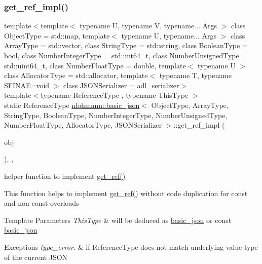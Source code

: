 \subsubsection{\texorpdfstring{get\+\_\+ref\+\_\+impl()}{get\_ref\_impl()}}
{\footnotesize\ttfamily template$<$template$<$ typename U, typename V, typename... Args $>$ class Object\+Type = std\+::map, template$<$ typename U, typename... Args $>$ class Array\+Type = std\+::vector, class String\+Type  = std\+::string, class Boolean\+Type  = bool, class Number\+Integer\+Type  = std\+::int64\+\_\+t, class Number\+Unsigned\+Type  = std\+::uint64\+\_\+t, class Number\+Float\+Type  = double, template$<$ typename U $>$ class Allocator\+Type = std\+::allocator, template$<$ typename T, typename S\+F\+I\+N\+A\+E=void $>$ class J\+S\+O\+N\+Serializer = adl\+\_\+serializer$>$ \\
template$<$typename Reference\+Type , typename This\+Type $>$ \\
static Reference\+Type \mbox{\hyperlink{classnlohmann_1_1basic__json}{nlohmann\+::basic\+\_\+json}}$<$ Object\+Type, Array\+Type, String\+Type, Boolean\+Type, Number\+Integer\+Type, Number\+Unsigned\+Type, Number\+Float\+Type, Allocator\+Type, J\+S\+O\+N\+Serializer $>$\+::get\+\_\+ref\+\_\+impl (\begin{DoxyParamCaption}\item[{This\+Type \&}]{obj }\end{DoxyParamCaption})\hspace{0.3cm}{\ttfamily [inline]}, {\ttfamily [static]}, {\ttfamily [private]}}



helper function to implement \mbox{\hyperlink{classnlohmann_1_1basic__json_afbd800010b67619463c0fce6e74f7878}{get\+\_\+ref()}} 

This function helps to implement \mbox{\hyperlink{classnlohmann_1_1basic__json_afbd800010b67619463c0fce6e74f7878}{get\+\_\+ref()}} without code duplication for const and non-\/const overloads


\begin{DoxyTemplParams}{Template Parameters}
{\em This\+Type} & will be deduced as {\ttfamily \mbox{\hyperlink{classnlohmann_1_1basic__json}{basic\+\_\+json}}} or {\ttfamily const \mbox{\hyperlink{classnlohmann_1_1basic__json}{basic\+\_\+json}}}\\
\hline
\end{DoxyTemplParams}

\begin{DoxyExceptions}{Exceptions}
{\em type\+\_\+error.} & if Reference\+Type does not match underlying value type of the current J\+S\+ON \\
\hline
\end{DoxyExceptions}
\mbox{\label{classnlohmann_1_1basic__json_a8a3db7d78f74232d3a6fb8f1abf69709}} 
